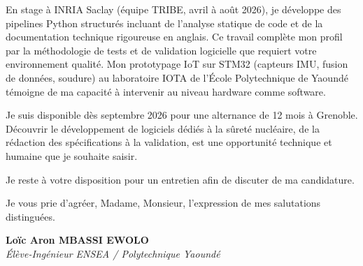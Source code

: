 \documentclass[a4paper,11pt]{article}
\begin{document}
En stage à INRIA Saclay (équipe TRIBE, avril à août 2026), je développe des pipelines Python structurés incluant de l'analyse statique de code et de la documentation technique rigoureuse en anglais. Ce travail complète mon profil par la méthodologie de tests et de validation logicielle que requiert votre environnement qualité. Mon prototypage IoT sur STM32 (capteurs IMU, fusion de données, soudure) au laboratoire IOTA de l'École Polytechnique de Yaoundé témoigne de ma capacité à intervenir au niveau hardware comme software.

Je suis disponible dès septembre 2026 pour une alternance de 12 mois à Grenoble. Découvrir le développement de logiciels dédiés à la sûreté nucléaire, de la rédaction des spécifications à la validation, est une opportunité technique et humaine que je souhaite saisir.

Je reste à votre disposition pour un entretien afin de discuter de ma candidature.

Je vous prie d'agréer, Madame, Monsieur, l'expression de mes salutations distinguées.

\vspace{0.8cm}

\textbf{Loïc Aron MBASSI EWOLO}\\
\textit{Élève-Ingénieur ENSEA / Polytechnique Yaoundé}
\end{document}
